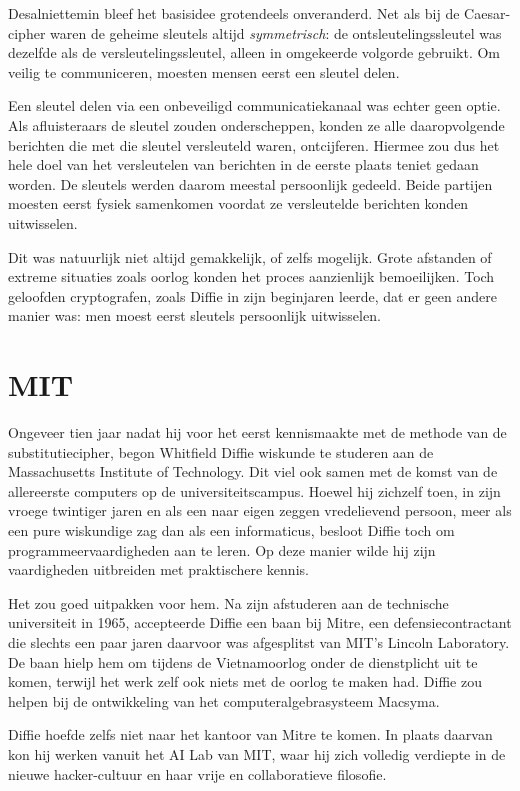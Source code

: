 \documentclass[
  a5paper,
  smalldemyvopaper,11pt,twoside,onecolumn,openright,extrafontsizes]{memoir}
\begin{document}
Desalniettemin bleef het basisidee grotendeels onveranderd. Net als bij
de Caesar-cipher waren de geheime sleutels altijd \emph{symmetrisch}: de
ontsleutelingssleutel was dezelfde als de versleutelingssleutel, alleen
in omgekeerde volgorde gebruikt. Om veilig te communiceren, moesten
mensen eerst een sleutel delen.

Een sleutel delen via een onbeveiligd communicatiekanaal was echter geen
optie. Als afluisteraars de sleutel zouden onderscheppen, konden ze alle
daaropvolgende berichten die met die sleutel versleuteld waren,
ontcijferen. Hiermee zou dus het hele doel van het versleutelen van
berichten in de eerste plaats teniet gedaan worden. De sleutels werden
daarom meestal persoonlijk gedeeld. Beide partijen moesten eerst fysiek
samenkomen voordat ze versleutelde berichten konden uitwisselen.

Dit was natuurlijk niet altijd gemakkelijk, of zelfs mogelijk. Grote
afstanden of extreme situaties zoals oorlog konden het proces
aanzienlijk bemoeilijken. Toch geloofden cryptografen, zoals Diffie in
zijn beginjaren leerde, dat er geen andere manier was: men moest eerst
sleutels persoonlijk uitwisselen.

\section{MIT}\label{mit}

Ongeveer tien jaar nadat hij voor het eerst kennismaakte met de methode
van de substitutiecipher, begon Whitfield Diffie wiskunde te studeren
aan de Massachusetts Institute of Technology. Dit viel ook samen met de
komst van de allereerste computers op de universiteitscampus. Hoewel hij
zichzelf toen, in zijn vroege twintiger jaren en als een naar eigen
zeggen vredelievend persoon, meer als een pure wiskundige zag dan als
een informaticus, besloot Diffie toch om programmeervaardigheden aan te
leren. Op deze manier wilde hij zijn vaardigheden uitbreiden met
praktischere kennis.

Het zou goed uitpakken voor hem. Na zijn afstuderen aan de technische
universiteit in 1965, accepteerde Diffie een baan bij Mitre, een
defensiecontractant die slechts een paar jaren daarvoor was afgesplitst
van MIT's Lincoln Laboratory. De baan hielp hem om tijdens de
Vietnamoorlog onder de dienstplicht uit te komen, terwijl het werk zelf
ook niets met de oorlog te maken had. Diffie zou helpen bij de
ontwikkeling van het computeralgebrasysteem Macsyma.

Diffie hoefde zelfs niet naar het kantoor van Mitre te komen. In plaats
daarvan kon hij werken vanuit het AI Lab van MIT, waar hij zich volledig
verdiepte in de nieuwe hacker-cultuur en haar vrije en collaboratieve
filosofie.
\end{document}
